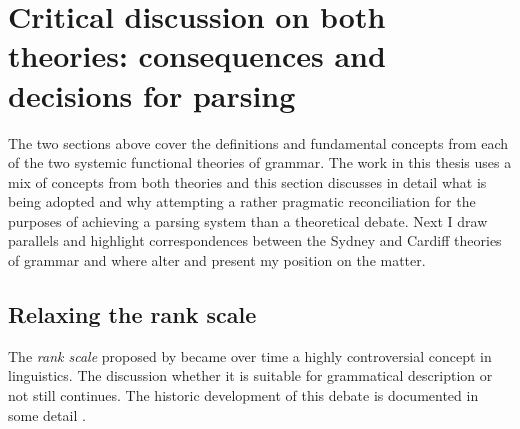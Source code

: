 \section{Critical discussion on both theories: consequences and decisions for parsing} 

The two sections above cover the definitions and fundamental concepts from each of the two systemic functional theories of grammar. The work in this thesis uses a mix of concepts from both theories and this section discusses in detail what is being adopted and why attempting a rather pragmatic reconciliation for the purposes of achieving a parsing system than a theoretical debate. Next I draw parallels and highlight correspondences between the Sydney and Cardiff theories of grammar and where alter and present my position on the matter. 

\subsection{Relaxing the rank scale}
\label{sec:rank-system}

The \textit{rank scale} proposed by \citet{Halliday2002} became over time a highly controversial concept in linguistics. The discussion whether it is suitable for grammatical description or not still continues. The historic development of this debate is documented in some detail \cite[309--338]{Fawcett2000}. %



